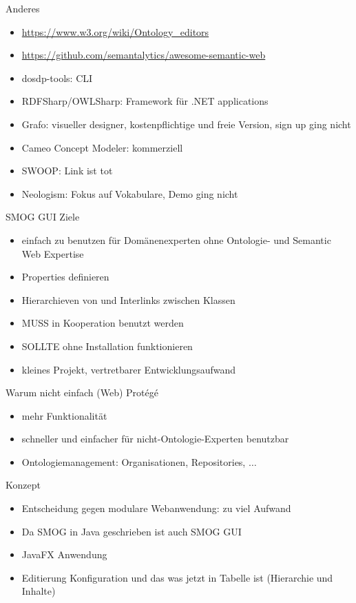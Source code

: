 \documentclass[14pt,aspectratio=1610]{beamer}
\begin{document}
\begin{frame}{Anderes}
\begin{itemize}
\item \url{https://www.w3.org/wiki/Ontology\_editors}
\item \url{https://github.com/semantalytics/awesome-semantic-web}
\item dosdp-tools: CLI
\item RDFSharp/OWLSharp: Framework für .NET applications
\item Grafo: visueller designer, kostenpflichtige und freie Version, sign up ging nicht
\item Cameo Concept Modeler: kommerziell
\item SWOOP: Link ist tot
\item Neologism: Fokus auf Vokabulare, Demo ging nicht
\end{itemize}
\end{frame}

\begin{frame}{SMOG GUI Ziele}
\begin{itemize}
\item einfach zu benutzen für Domänenexperten ohne Ontologie- und Semantic Web Expertise
\item Properties definieren
\item Hierarchieven von und Interlinks zwischen Klassen
\item MUSS in Kooperation benutzt werden
\item SOLLTE ohne Installation funktionieren
\item kleines Projekt, vertretbarer Entwicklungsaufwand
\end{itemize}
\end{frame}

\begin{frame}{Warum nicht einfach (Web) Protégé}
\begin{itemize}
\item mehr Funktionalität
\item schneller und einfacher für nicht-Ontologie-Experten benutzbar
\item Ontologiemanagement: Organisationen, Repositories, $\ldots$
\end{itemize}
\end{frame}

\begin{frame}{Konzept}
\begin{itemize}
\item Entscheidung gegen modulare Webanwendung: zu viel Aufwand
\item Da SMOG in Java geschrieben ist auch SMOG GUI
\item JavaFX Anwendung
\item Editierung Konfiguration und das was jetzt in Tabelle ist (Hierarchie und Inhalte)
\end{itemize}
\end{frame}
\end{document}
